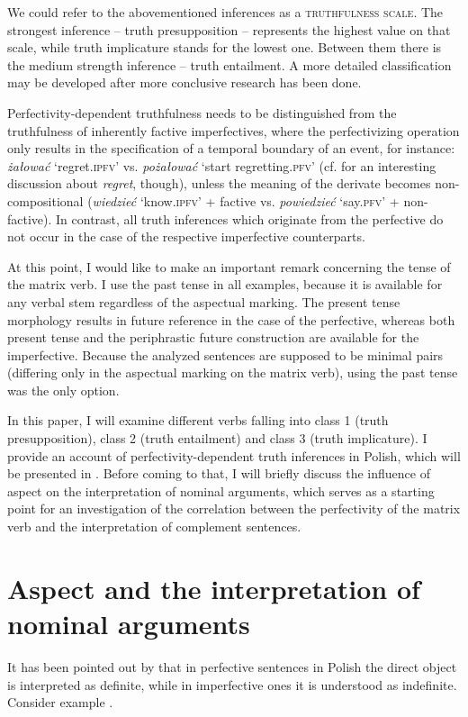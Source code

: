 \documentclass[output=paper,  modfonts,  newtxmath,  hidelinks		  ]{langscibook}
\begin{document}
We could refer to the abovementioned inferences as a \textsc{truthfulness scale}. The strongest inference -- truth presupposition -- represents the highest value on that scale, while truth implicature stands for the lowest one. Between them there is the medium strength inference -- truth entailment. A more detailed classification may be developed after more conclusive research has been done.

Perfectivity-dependent truthfulness needs to be distinguished from the truthfulness of inherently factive imperfectives, where the perfectivizing operation only results in the specification of a temporal boundary of an event, for instance: \textit{żałować} `regret.\textsc{ipfv}’ vs. \textit{pożałować} `start regretting.\textsc{pfv}’ (cf. \citealt{Egré2008} for an interesting discussion about \textit{regret}, though), unless the meaning of the derivate becomes non-compositional (\textit{wiedzieć}
`know.\textsc{ipfv}’ + factive vs. \textit{powiedzieć} `say.\textsc{pfv}’ + non-factive). In contrast, all truth inferences which originate from the perfective do not occur in the case of the respective imperfective counterparts.\par At this point, I would like to make an important remark concerning the tense of the matrix verb. I use the past tense in all examples, because it is available for any verbal stem regardless of the aspectual marking. The present tense morphology results in future reference in the case of the perfective, whereas both present tense and the periphrastic future construction are available for the imperfective. Because the analyzed sentences are supposed to be minimal pairs (differing only in the aspectual marking on the matrix verb), using the past tense was the only option.\par In this paper, I will examine different verbs falling into class 1 (truth presupposition), class 2 (truth entailment) and class 3 (truth implicature). I provide an account of perfectivity-dependent truth inferences in Polish, which will be presented in . Before coming to that, I will briefly discuss the influence of aspect on the interpretation of nominal arguments, which serves as a starting point for an investigation of the correlation between the perfectivity of the matrix verb and the interpretation of complement sentences.

\section{Aspect and the interpretation of nominal arguments}
It has been pointed out by \cite{Wierzbicka1967} that in perfective sentences in Polish the direct object is interpreted as definite, while in imperfective ones it is understood as indefinite. Consider example .
\end{document}
